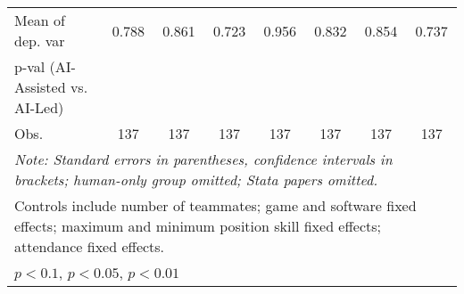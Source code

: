 \begin{tabular}{l*{7}{c}}
Mean of dep. var    &    0.788   &    0.861   &    0.723   &    0.956   &    0.832   &    0.854   &    0.737   \\
p-val (AI-Assisted vs. AI-Led)&   &   &   &   &   &   &   \\
Obs.                &137   &137   &137   &137   &137   &137   &137   \\
\hline
\hline\hline
\multicolumn{8}{l}{\it{Note:} Standard errors in parentheses, confidence intervals in brackets; human-only group omitted; Stata papers omitted.}\\
\multicolumn{8}{l}{Controls include number of teammates; game and software fixed effects; maximum and minimum position skill fixed effects; attendance fixed effects.}\\
\multicolumn{8}{l}{\sym{*} \(p<0.1\), \sym{**} \(p<0.05\), \sym{***} \(p<0.01\)}\\
\end{tabular}

